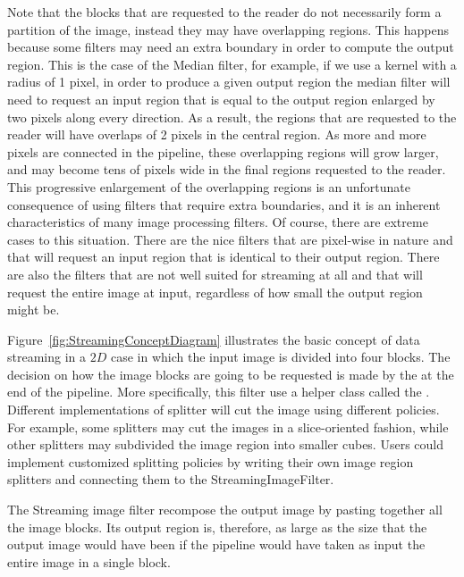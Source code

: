 \documentclass{InsightArticle}
\begin{document}
 Note that the blocks that are requested to the reader do not necessarily form
 a partition of the image, instead they may have overlapping regions. This
 happens because some filters may need an extra boundary in order to compute
 the output region. This is the case of the Median filter, for example, if we
 use a kernel with a radius of 1 pixel, in order to produce a given output region
 the median filter will need to request an input region that is equal to the
 output region enlarged by two pixels along every direction. As a result, the
 regions that are requested to the reader will have overlaps of 2 pixels in the
 central region.  As more and more pixels are connected in the pipeline, these
 overlapping regions will grow larger, and may become tens of pixels wide in
 the final regions requested to the reader. This progressive enlargement of the
 overlapping regions is an unfortunate consequence of using filters that
 require extra boundaries, and it is an inherent characteristics of many image
 processing filters. Of course, there are extreme cases to this situation.
 There are the nice filters that are pixel-wise in nature and that will request
 an input region that is identical to their output region. There are also the
 filters that are not well suited for streaming at all and that will request
 the entire image at input, regardless of how small the output region might be.

Figure~\ref{fig:StreamingConceptDiagram} illustrates the basic concept of data
streaming in a $2D$ case in which the input image is divided into four blocks.
The decision on how the image blocks are going to be requested is made by the
 at the end of the pipeline. More specifically,
this filter use a helper class called the .
Different implementations of splitter will cut the image using different
policies. For example, some splitters may cut the images in a slice-oriented
fashion, while other splitters may subdivided the image region into smaller
cubes. Users could implement customized splitting policies by writing their own
image region splitters and connecting them to the StreamingImageFilter.

The Streaming image filter recompose the output image by pasting together all
the image blocks. Its output region is, therefore, as large as the size that
the output image would have been if the pipeline would have taken as input the
entire image in a single block.
\end{document}
